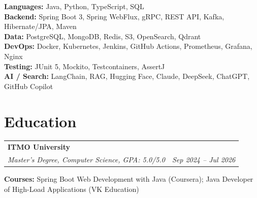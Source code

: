 \documentclass[a4paper,10pt]{article}
\makeatletter
\newcommand{\resumeSubheading}[4]{
    \vspace{-3pt}
    \begin{tabular*}{\textwidth}{l@{\extracolsep{\fill}}r}
    \textbf{#1} & #2 \\
    \textit{\small#3} & \textit{\small #4} \\
    \end{tabular*}
    \vspace{-5pt}
}
\makeatother
\begin{document}
\textbf{Languages:} Java, Python, TypeScript, SQL \\
\textbf{Backend:} Spring Boot 3, Spring WebFlux, gRPC, REST API, Kafka, Hibernate/JPA, Maven \\
\textbf{Data:} PostgreSQL, MongoDB, Redis, S3, OpenSearch, Qdrant \\
\textbf{DevOps:} Docker, Kubernetes, Jenkins, GitHub Actions, Prometheus, Grafana, Nginx \\
\textbf{Testing:} JUnit 5, Mockito, Testcontainers, AssertJ \\
\textbf{AI / Search:} LangChain, RAG, Hugging Face, Claude, DeepSeek, ChatGPT, GitHub Copilot

\section{Education}

\vspace{4pt}
\resumeSubheading
{ITMO University}{}
{Master's Degree, Computer Science, GPA: 5.0/5.0}{Sep 2024 -- Jul 2026}

\vspace{4pt}

\textbf{Courses:} Spring Boot Web Development with Java (Coursera); Java Developer of High-Load Applications (VK Education)
\end{document}
